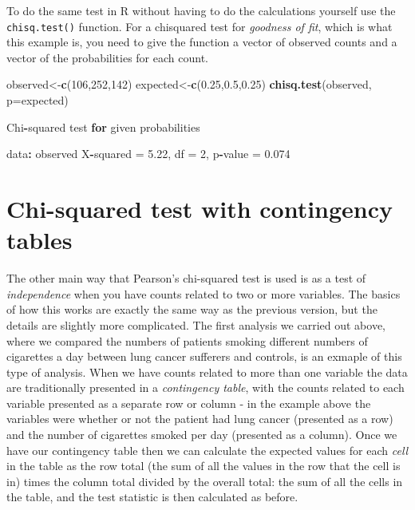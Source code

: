 \documentclass[
]{book}
\newenvironment{Shaded}{\begin{snugshade}}{\end{snugshade}}
\newcommand{\ControlFlowTok}[1]{\textcolor[rgb]{0.13,0.29,0.53}{\textbf{#1}}}
\newcommand{\DataTypeTok}[1]{\textcolor[rgb]{0.13,0.29,0.53}{#1}}
\newcommand{\DecValTok}[1]{\textcolor[rgb]{0.00,0.00,0.81}{#1}}
\newcommand{\FloatTok}[1]{\textcolor[rgb]{0.00,0.00,0.81}{#1}}
\newcommand{\KeywordTok}[1]{\textcolor[rgb]{0.13,0.29,0.53}{\textbf{#1}}}
\newcommand{\NormalTok}[1]{#1}
\newcommand{\OperatorTok}[1]{\textcolor[rgb]{0.81,0.36,0.00}{\textbf{#1}}}
\newcommand{\StringTok}[1]{\textcolor[rgb]{0.31,0.60,0.02}{#1}}
\begin{document}
To do the same test in R without having to do the calculations yourself use the \texttt{chisq.test()} function. For a chisquared test for \emph{goodness of fit}, which is what this example is, you need to give the function a vector of observed counts and a vector of the probabilities for each count.

\begin{Shaded}
\begin{Highlighting}[]
\NormalTok{observed<-}\KeywordTok{c}\NormalTok{(}\DecValTok{106}\NormalTok{,}\DecValTok{252}\NormalTok{,}\DecValTok{142}\NormalTok{)}
\NormalTok{expected<-}\KeywordTok{c}\NormalTok{(}\FloatTok{0.25}\NormalTok{,}\FloatTok{0.5}\NormalTok{,}\FloatTok{0.25}\NormalTok{)}
\KeywordTok{chisq.test}\NormalTok{(observed, }\DataTypeTok{p=}\NormalTok{expected)}

\NormalTok{    Chi}\OperatorTok{-}\NormalTok{squared test }\ControlFlowTok{for}\NormalTok{ given probabilities}

\NormalTok{data}\OperatorTok{:}\StringTok{  }\NormalTok{observed}
\NormalTok{X}\OperatorTok{-}\NormalTok{squared =}\StringTok{ }\FloatTok{5.22}\NormalTok{, df =}\StringTok{ }\DecValTok{2}\NormalTok{, p}\OperatorTok{-}\NormalTok{value =}\StringTok{ }\FloatTok{0.074}
\end{Highlighting}
\end{Shaded}

\hypertarget{chi-squared-test-with-contingency-tables}{%
\section{Chi-squared test with contingency tables}\label{chi-squared-test-with-contingency-tables}}

The other main way that Pearson's chi-squared test is used is as a test of \emph{independence} when you have counts related to two or more variables. The basics of how this works are exactly the same way as the previous version, but the details are slightly more complicated. The first analysis we carried out above, where we compared the numbers of patients smoking different numbers of cigarettes a day between lung cancer sufferers and controls, is an exmaple of this type of analysis. When we have counts related to more than one variable the data are traditionally presented in a \emph{contingency table}, with the counts related to each variable presented as a separate row or column - in the example above the variables were whether or not the patient had lung cancer (presented as a row) and the number of cigarettes smoked per day (presented as a column). Once we have our contingency table then we can calculate the expected values for each \emph{cell} in the table as the row total (the sum of all the values in the row that the cell is in) times the column total divided by the overall total: the sum of all the cells in the table, and the test statistic is then calculated as before.
\end{document}
